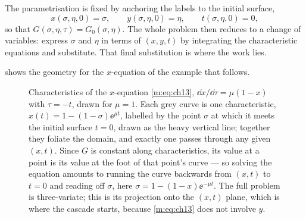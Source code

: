 The parametrisation is fixed by anchoring the labels to the initial surface,
\begin{equation}
\label{m:eq:ICpar}
x(\sigma,\eta,0)=\sigma,
\qquad
y(\sigma,\eta,0)=\eta,
\qquad
t(\sigma,\eta,0)=0 ,
\end{equation}
so that $G(\sigma,\eta,\tau)=G_0(\sigma,\eta)$. The whole problem then reduces to a
change of variables: express $\sigma$ and $\eta$ in terms of $(x,y,t)$ by
integrating the characteristic equations and substitute. That final substitution is
where the work lies.

 shows the geometry for the $x$-equation of the example
that follows.

\begin{figure}[ht]
\centering
{}
\caption{Characteristics of the $x$-equation \cref{m:eq:ch13},
$\dd x/\dd\tau=\mu(1-x)$ with $\tau=-t$, drawn for $\mu=1$. Each grey curve is one
characteristic, $x(t)=1-(1-\sigma)\ee^{\mu t}$, labelled by the point $\sigma$ at
which it meets the initial surface $t=0$, drawn as the heavy vertical line;
together they foliate the domain, and
exactly one passes through any given $(x,t)$. Since $G$ is constant along
characteristics, its value at a point is its value at the foot of that point's
curve --- so solving the equation amounts to running the curve backwards from
$(x,t)$ to $t=0$ and reading off $\sigma$, here $\sigma=1-(1-x)\ee^{-\mu t}$. The
full problem is three-variate; this is its projection onto the $(x,t)$ plane, which
is where the cascade starts, because \cref{m:eq:ch13} does not involve $y$.}
\label{m:fig:characteristics}
\end{figure}

